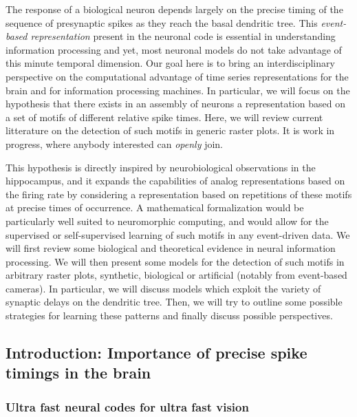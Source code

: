 The response of a biological neuron depends largely on the precise timing of the sequence of presynaptic spikes as they reach the basal dendritic tree. This \emph{event-based representation} present in the neuronal code is essential in understanding information processing and yet, most neuronal models do not take advantage of this minute temporal dimension. Our goal here is to bring an interdisciplinary perspective on the computational advantage of time series representations for the brain and for information processing machines. In particular, we will focus on the hypothesis that there exists in an assembly of neurons a representation based on a set of motifs of different relative spike times. Here, we will review current litterature on the detection of such motifs in generic raster plots. It is work in progress, where anybody interested can \emph{openly} join.

This hypothesis is directly inspired by neurobiological observations in the hippocampus, and it expands the capabilities of analog representations based on the firing rate by considering a representation based on repetitions of these motifs at precise times of occurrence. A mathematical formalization would be particularly well suited to neuromorphic computing, and would allow for the supervised or self-supervised learning of such motifs in any event-driven data. We will first review some biological and theoretical evidence in neural information processing. We will then present some models for the detection of such motifs in arbitrary raster plots, synthetic, biological or artificial (notably from event-based cameras). In particular, we will discuss models which exploit the variety of synaptic delays on the dendritic tree. Then, we will try to outline some possible strategies for learning these patterns and finally discuss possible perspectives.

\hypertarget{introduction-importance-of-precise-spike-timings-in-the-brain}{%
\subsection{Introduction: Importance of precise spike timings in the brain}\label{introduction-importance-of-precise-spike-timings-in-the-brain}}

\hypertarget{ultra-fast-neural-codes-for-ultra-fast-vision}{%
\subsubsection{Ultra fast neural codes for ultra fast vision}\label{ultra-fast-neural-codes-for-ultra-fast-vision}}

